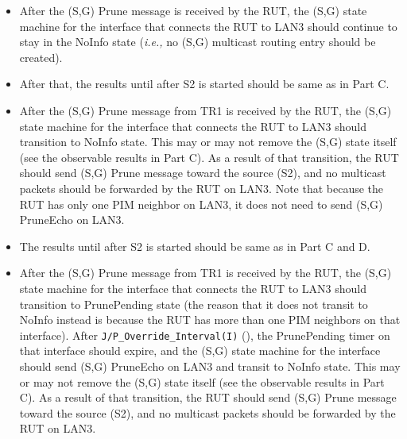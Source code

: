 \documentclass[11pt]{report}
\newcommand{\ie}{\emph{i.e.,}\xspace}
\begin{document}
\begin{itemize}

  \item After the (S,G) Prune message is received by the RUT,
  the (S,G) state machine for the interface that connects the RUT to
  LAN3 should continue to stay in the NoInfo state (\ie no (S,G) multicast
  routing entry should be created).

  \item After that, the results until after S2 is started should be same as in
  Part C.

  \item After the (S,G) Prune message from TR1 is received by the RUT,
  the (S,G) state machine for the interface that connects the RUT to
  LAN3 should transition to NoInfo state. This may or may not remove
  the (S,G) state itself (see the observable results in Part C).
  As a result of that transition, the RUT should send (S,G) Prune
  message toward the source (S2), and no multicast packets should be
  forwarded by the RUT on LAN3. Note that because the RUT has only one
  PIM neighbor on LAN3, it does not need to send (S,G) PruneEcho on
  LAN3.

\end{itemize}


\begin{itemize}

  \item The results until after S2 is started should be same as in
  Part C and D.

  \item After the (S,G) Prune message from TR1 is received by the RUT,
  the (S,G) state machine for the interface that connects the RUT to
  LAN3 should transition to PrunePending state (the reason that it does
  not transit to NoInfo instead is because the RUT has more than one PIM
  neighbors on that interface).
  After \verb=J/P_Override_Interval(I)= (\PimsmJPOverrideIntervalI),
  the PrunePending timer on that interface should expire, and the
  (S,G) state machine for the interface should send (S,G) PruneEcho
  on LAN3 and transit to NoInfo
  state. This may or may not remove the (S,G) state itself (see the observable
  results in Part C).
  As a result of that transition, the RUT should send (S,G) Prune
  message toward the source (S2), and no multicast packets should be
  forwarded by the RUT on LAN3.

\end{itemize}
\end{document}

